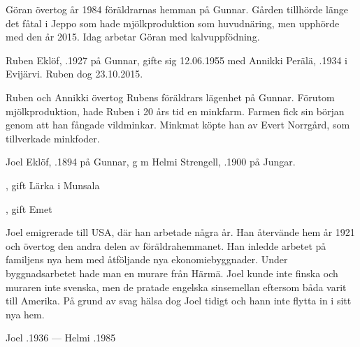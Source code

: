 Göran övertog år 1984  föräldrarnas hemman på Gunnar. Gården tillhörde länge det fåtal i Jeppo som hade mjölkproduktion som huvudnäring, men upphörde med den år 2015. Idag arbetar Göran med kalvuppfödning.


%
Ruben Eklöf,  .1927 på Gunnar, gifte sig 12.06.1955 med Annikki  Perälä,  .1934 i Evijärvi. Ruben dog 23.10.2015.
\begin{jhchildren}
  \item {}
  \item {}
\end{jhchildren}

Ruben och Annikki övertog Rubens föräldrars lägenhet på Gunnar. Förutom mjölkproduktion, hade Ruben i 20 års tid en minkfarm. Farmen fick sin början genom att han fångade vildminkar. Minkmat köpte han av Evert Norrgård, som tillverkade minkfoder.


%
Joel Eklöf, .1894 på Gunnar, g m Helmi Strengell, .1900 på Jungar.
\begin{jhchildren}
  \item {}, gift Lärka i Munsala
  \item {}
  \item {}, gift Emet
\end{jhchildren}

Joel emigrerade till USA, där han arbetade några år. Han återvände hem år 1921 och övertog den andra delen av föräldrahemmanet. Han inledde arbetet på familjens nya hem med åtföljande nya ekonomiebyggnader. Under byggnadsarbetet hade man en murare från Härmä. Joel kunde inte finska och muraren inte svenska, men de pratade engelska sinsemellan eftersom båda varit till Amerika. På grund av svag hälsa dog Joel tidigt och hann inte flytta in i sitt nya hem.

Joel .1936  ---  Helmi .1985



%


